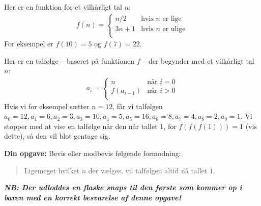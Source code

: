 Her er en funktion for et vilkårligt tal $n$:
\begin{align*}
f(n) = \begin{cases}
n/2 &\text{hvis }n\text{ er lige}\\
3n + 1 &\text{hvis }n\text{ er ulige}\\
\end{cases}
\end{align*}
For eksempel er $f(10) = 5$ og $f(7) = 22$.

Her er en talfølge -- baseret på funktionen $f$ -- der begynder med et
vilkårligt tal $n$:
\begin{align*}
a_i = \begin{cases}
n &\text{når }i = 0\\
f(a_{i - 1}) &\text{når }i > 0\\
\end{cases}
\end{align*}
Hvis vi for eksempel sætter $n = 12$, får vi talfølgen
$a_0 = 12, a_1 = 6, a_2 = 3, a_3 = 10, a_4 = 5, a_5 = 16, a_6 = 8, a_7 = 4, a_8
= 2, a_9 = 1$.  Vi stopper med at vise en talfølge når den når tallet $1$, for
$f(f(f(1))) = 1$ (vis dette), så den vil blot gentage sig.

\textbf{Din opgave:} Bevis eller modbevis følgende formodning:
\begin{quote}
Ligemeget hvilket $n$ der vælges, vil talfølgen altid nå tallet $1$.
\end{quote}

\textbf{\emph{NB: Der udloddes en flaske snaps til den første som kommer op i
baren med en korrekt besvarelse af denne opgave!}}
